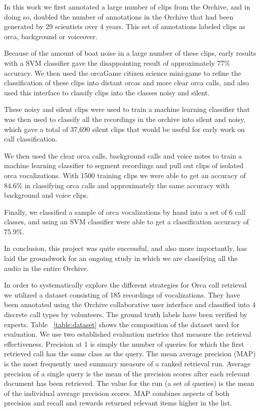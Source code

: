 In this work we first annotated a large number of clips from the
Orchive, and in doing so, doubled the number of annotations in the
Orchive that had been generated by 29 scientists over 4 years.  This
set of annotations labeled clips as orca, background or voiceover.

Because of the amount of boat noise in a large number of these clips,
early results with a SVM classifier gave the disappointing result of
approximately 77\% accuracy.  We then used the orcaGame citizen
science mini-game to refine the classification of these clips into
distant orcas and more clear orca calls, and also used this interface
to classify clips into the classes noisy and silent.

These noisy and silent clips were used to train a machine learning
classifier that was then used to classify all the recordings in the
orchive into silent and noisy, which gave a total of 37,690 silent
clips that would be useful for early work on call classification.

We then used the clear orca calls, background calls and voice notes to
train a machine learning classifier to segment recordings and pull out
clips of isolated orca vocalizations.  With 1500 training clips we
were able to get an accuracy of 84.6\% in classifying orca calls and
approximately the same accuracy with background and voice clips.

Finally, we classified a sample of orca vocalizations by hand into a
set of 6 call classes, and using an SVM classifier were able to get a
classification accuracy of 75.9\%.

In conclusion, this project was quite successful, and also more
importantly, has laid the groundwork for an ongoing study in which we
are classifying all the audio in the entire Orchive.

In order to systematically explore the different strategies for Orca
call retrieval we utilized a dataset consisting of 185 recordings of
vocalizations. They have been annotated using the Orchive
collaborative user interface and classified into 4 discrete call types
by volunteers. The ground truth labels have been verified by
experts. Table ~\ref{table:dataset} shows the composition of the
dataset used for evaluation. We use two established evaluation metrics
that measure the retrieval effectiveness. Precision at 1 is simply the
number of queries for which the first retrieved call has the same
class as the query. The mean average precision (MAP) is the most
frequently used summary measure of a ranked retrieval run. Average
precision of a single query is the mean of the precision scores after
each relevant document has been retrieved. The value for the run (a
set of queries) is the mean of the individual average precision
scores. MAP combines aspects of both precision and recall and rewards
returned relevant items higher in the list.


